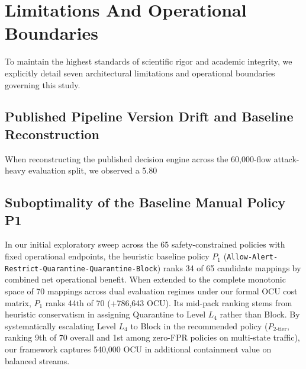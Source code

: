 \documentclass[journal,10pt,onecolumn]{IEEEtran}
\begin{document}
\section{Limitations And Operational Boundaries}

To maintain the highest standards of scientific rigor and academic integrity, we explicitly detail seven architectural limitations and operational boundaries governing this study.


\subsection{Published Pipeline Version Drift and Baseline Reconstruction}
When reconstructing the published decision engine \cite{1} across the 60,000-flow attack-heavy evaluation split, we observed a 5.80%


\subsection{Suboptimality of the Baseline Manual Policy P1}
In our initial exploratory sweep across the 65 safety-constrained policies with fixed operational endpoints, the heuristic baseline policy $P_1$ (\texttt{Allow-Alert-Restrict-Quarantine-Quarantine-Block}) ranks 34 of 65 candidate mappings by combined net operational benefit. When extended to the complete monotonic space of 70 mappings across dual evaluation regimes under our formal OCU cost matrix, $P_1$ ranks 44th of 70 (+786,643 OCU). Its mid-pack ranking stems from heuristic conservatism in assigning Quarantine to Level $L_4$ rather than Block. By systematically escalating Level $L_4$ to Block in the recommended policy ($P_{2\text{-tier}}$, ranking 9th of 70 overall and 1st among zero-FPR policies on multi-state traffic), our framework captures 540,000 OCU in additional containment value on balanced streams.
\end{document}
